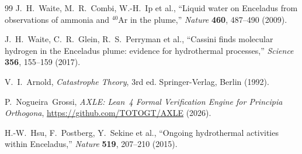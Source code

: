 \documentclass[12pt]{article}
\numberwithin{equation}{section}
\theoremstyle{remark}
\begin{document}
\begin{thebibliography}{99}
J.~H.~Waite, M.~R.~Combi, W.-H.~Ip et al.,
``Liquid water on Enceladus from observations of ammonia and ${}^{40}$Ar
  in the plume,''
\emph{Nature} \textbf{460}, 487--490 (2009).

J.~H.~Waite, C.~R.~Glein, R.~S.~Perryman et al.,
``Cassini finds molecular hydrogen in the Enceladus plume: evidence for
  hydrothermal processes,''
\emph{Science} \textbf{356}, 155--159 (2017).

V.~I.~Arnold,
\emph{Catastrophe Theory}, 3rd ed.
Springer-Verlag, Berlin (1992).

P.~Nogueira~Grossi,
\emph{AXLE: Lean~4 Formal Verification Engine for Principia Orthogona},
\url{https://github.com/TOTOGT/AXLE} (2026).

H.-W.~Hsu, F.~Postberg, Y.~Sekine et al.,
``Ongoing hydrothermal activities within Enceladus,''
\emph{Nature} \textbf{519}, 207--210 (2015).

\end{thebibliography}
\end{document}
